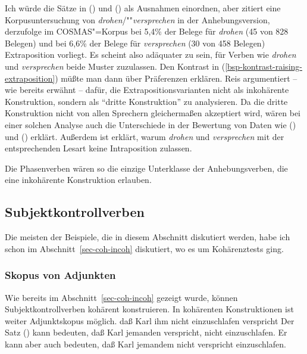 \noindent
Ich würde die Sätze in () und () als Ausnahmen einordnen, aber \citet{Reis2005a} 
zitiert eine Korpusuntersuchung von \emph{drohen}/""\emph{versprechen} in der Anhebungsversion,
derzufolge im COSMAS"=Korpus bei 5,4\% der Belege für \emph{drohen} (45 von 828 Belegen)
und bei 6,6\% der Belege für \emph{versprechen} (30 von 458 Belegen) Extraposition vorliegt.
Es scheint also adäquater zu sein, für Verben wie \emph{drohen} und \emph{versprechen} 
beide Muster zuzulassen. Den Kontrast in (\ref{bsp-kontrast-raising-extraposition}) müßte man dann über Präferenzen erklären.
Reis argumentiert -- wie bereits erwähnt -- dafür, die Extrapositionsvarianten 
nicht als inkohärente Konstruktion, sondern als "`dritte Konstruktion"' zu analysieren. Da die
dritte Konstruktion nicht von allen Sprechern gleichermaßen akzeptiert wird, wären bei
einer solchen Analyse auch die Unterschiede in der Bewertung von Daten wie () und ()
erklärt. Außerdem ist erklärt, warum \emph{drohen} und \emph{versprechen} mit der entsprechenden Lesart
keine Intraposition zulassen.%

Die Phasenverben wären so die einzige Unterklasse der Anhebungsverben,
die eine inkohärente Konstruktion erlauben.

\subsection{Subjektkontrollverben}

Die meisten der Beispiele, die in diesem Abschnitt diskutiert werden, habe
ich schon im Abschnitt~\ref{sec-coh-incoh} diskutiert, wo es um Kohärenztests ging.


\subsubsection{Skopus von Adjunkten}
\label{sec-subj-contr-scope}

Wie bereits im Abschnitt~\ref{sec-coh-incoh} gezeigt wurde, können Subjektkontrollverben
kohärent konstruieren.
In kohärenten Konstruktionen ist weiter Adjunktskopus möglich.
\ea{}
daß Karl ihm nicht einzuschlafen verspricht
\z
%
Der Satz () kann bedeuten, daß Karl jemanden verspricht, nicht einzuschlafen. Er kann aber
auch bedeuten, daß Karl jemandem nicht verspricht einzuschlafen.


